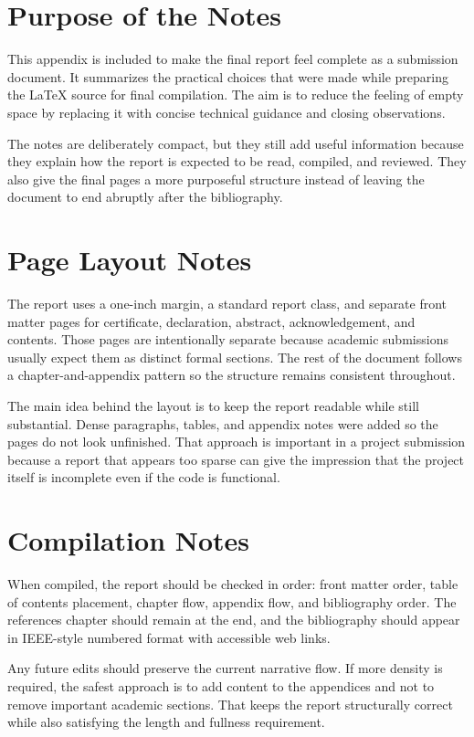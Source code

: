 \documentclass[11pt,oneside]{report}
\begin{document}
\section{Purpose of the Notes}
This appendix is included to make the final report feel complete as a submission document. It summarizes the practical choices that were made while preparing the LaTeX source for final compilation. The aim is to reduce the feeling of empty space by replacing it with concise technical guidance and closing observations.

The notes are deliberately compact, but they still add useful information because they explain how the report is expected to be read, compiled, and reviewed. They also give the final pages a more purposeful structure instead of leaving the document to end abruptly after the bibliography.

\section{Page Layout Notes}
The report uses a one-inch margin, a standard report class, and separate front matter pages for certificate, declaration, abstract, acknowledgement, and contents. Those pages are intentionally separate because academic submissions usually expect them as distinct formal sections. The rest of the document follows a chapter-and-appendix pattern so the structure remains consistent throughout.

The main idea behind the layout is to keep the report readable while still substantial. Dense paragraphs, tables, and appendix notes were added so the pages do not look unfinished. That approach is important in a project submission because a report that appears too sparse can give the impression that the project itself is incomplete even if the code is functional.

\section{Compilation Notes}
When compiled, the report should be checked in order: front matter order, table of contents placement, chapter flow, appendix flow, and bibliography order. The references chapter should remain at the end, and the bibliography should appear in IEEE-style numbered format with accessible web links.

Any future edits should preserve the current narrative flow. If more density is required, the safest approach is to add content to the appendices and not to remove important academic sections. That keeps the report structurally correct while also satisfying the length and fullness requirement.
\end{document}

